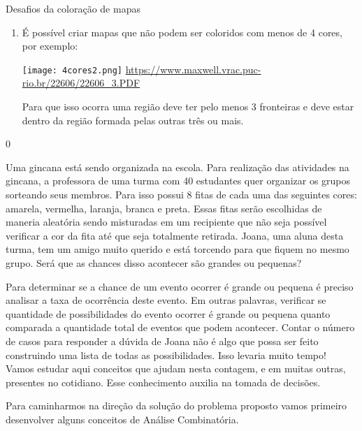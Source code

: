 \begin{answer}{Desafios da coloração de mapas}
{\begin{enumerate}[wide]
Não seria possível listar todos esses casos, por este motivo os Princípios Fundamentais são usados. 

\item É possível criar mapas que não podem ser coloridos com menos de 4 cores, por exemplo: 
\begin{center} 

\texttt{[image: 4cores2.png]}
\url{https://www.maxwell.vrac.puc-rio.br/22606/22606_3.PDF}
\end{center}

Para que isso ocorra uma região deve ter pelo menos 3 fronteiras e deve estar dentro da região formada pelas outras três ou mais.

\end{enumerate}
}{0}
\end{answer}


Uma gincana está sendo organizada na escola. Para realização das atividades na gincana, a professora de uma turma com 40 estudantes quer organizar os grupos sorteando seus membros. Para isso possui 8 fitas de cada uma das seguintes cores: amarela, vermelha, laranja, branca e preta. Essas fitas serão escolhidas de maneria aleatória sendo misturadas em um recipiente que não seja possível verificar a cor da fita até que seja totalmente retirada.  Joana, uma aluna desta turma, tem um amigo muito querido e está torcendo para que fiquem no mesmo grupo. Será que as chances disso acontecer são grandes ou pequenas?


Para determinar se a chance de um evento ocorrer é grande ou pequena é preciso analisar a taxa de ocorrência deste evento. Em outras palavras, verificar se quantidade de possibilidades do evento ocorrer é grande ou pequena quanto comparada a quantidade total de eventos que podem acontecer. 
Contar o número de casos para responder a dúvida de Joana não é algo que possa ser feito construindo uma lista de todas as possibilidades. Isso levaria muito tempo! Vamos estudar aqui conceitos que ajudam nesta contagem, e em muitas outras, presentes no cotidiano. Esse conhecimento auxilia na tomada de decisões.  

Para caminharmos na direção da solução do problema proposto vamos primeiro desenvolver alguns conceitos de Análise Combinatória. 

